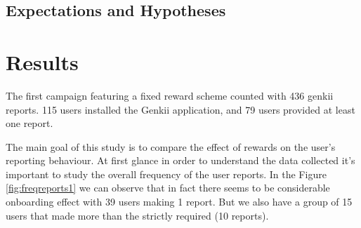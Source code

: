 \documentclass[letterpaper]{article}
\begin{document}
%
%
%
%
%
%

\subsection{Expectations and Hypotheses}


\section{Results}

The first campaign featuring a fixed reward scheme counted with 436 genkii reports.
115 users installed the Genkii application, and 79 users provided at least one report.

The main goal of this study is to compare the effect of rewards on the user's reporting behaviour.
At first glance in order to understand the data collected it's important to study the overall frequency of the user reports. In the Figure \ref{fig:freqreports1} we can observe that in fact there seems to be considerable onboarding effect with 39 users making 1 report. But we also have a group of 15 users that made more than the strictly required (10 reports).
\end{document}
